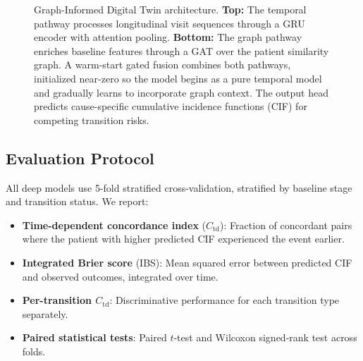\begin{figure}[!t]
\caption{Graph-Informed Digital Twin architecture. \textbf{Top:} The temporal pathway processes longitudinal visit sequences through a GRU encoder with attention pooling. \textbf{Bottom:} The graph pathway enriches baseline features through a GAT over the patient similarity graph. A warm-start gated fusion combines both pathways, initialized near-zero so the model begins as a pure temporal model and gradually learns to incorporate graph context. The output head predicts cause-specific cumulative incidence functions (CIF) for competing transition risks.}
\label{p3:fig:architecture}
\end{figure}

\subsection{Evaluation Protocol}
\label{p3:sec:evaluation}

All deep models use 5-fold stratified cross-validation, stratified by baseline stage and transition status. We report:
\begin{itemize}
    \item \textbf{Time-dependent concordance index} ($C_\text{td}$): Fraction of concordant pairs where the patient with higher predicted CIF experienced the event earlier.
    \item \textbf{Integrated Brier score} (IBS): Mean squared error between predicted CIF and observed outcomes, integrated over time.
    \item \textbf{Per-transition $C_\text{td}$}: Discriminative performance for each transition type separately.
    \item \textbf{Paired statistical tests}: Paired $t$-test and Wilcoxon signed-rank test across folds.
\end{itemize}

